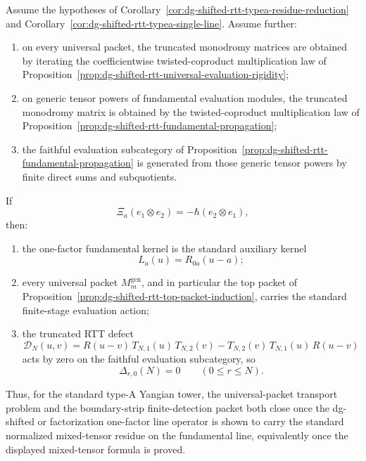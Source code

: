 \begin{corollary}
\label{cor:dg-shifted-rtt-typea-single-line-bootstrap}
Assume the hypotheses of
Corollary~\ref{cor:dg-shifted-rtt-typea-residue-reduction}
and
Corollary~\ref{cor:dg-shifted-rtt-typea-single-line}. Assume
further:
\begin{enumerate}[label=\textup{(\roman*)}]
\item on every universal packet, the truncated monodromy matrices are
 obtained by iterating the coefficientwise twisted-coproduct
 multiplication law of
 Proposition~\ref{prop:dg-shifted-rtt-universal-evaluation-rigidity};
\item on generic tensor powers of fundamental evaluation modules, the
 truncated monodromy matrix is obtained by the twisted-coproduct
 multiplication law of
 Proposition~\ref{prop:dg-shifted-rtt-fundamental-propagation};
\item the faithful evaluation subcategory of
 Proposition~\ref{prop:dg-shifted-rtt-fundamental-propagation} is
 generated from those generic tensor powers by finite direct sums and
 subquotients.
\end{enumerate}
If
\[
\Xi_a(e_1\otimes e_2)=-\hbar(e_2\otimes e_1),
\]
then:
\begin{enumerate}[label=\textup{(\alph*)}]
\item the one-factor fundamental kernel is the standard auxiliary
 kernel
 \[
 L_a(u)=R_{0a}(u-a);
 \]
\item every universal packet $M_m^{\mathrm{gen}}$, and in particular
 the top packet of
 Proposition~\ref{prop:dg-shifted-rtt-top-packet-induction}, carries
 the standard finite-stage evaluation action;
\item the truncated RTT defect
 \[
 \mathcal{D}_N(u,v)
 =
 R(u-v)\,T_{N,1}(u)\,T_{N,2}(v)
 -
 T_{N,2}(v)\,T_{N,1}(u)\,R(u-v)
 \]
 acts by zero on the faithful evaluation subcategory, so
 \[
 \Delta_{r,0}(N)=0
 \qquad (0\le r\le N).
 \]
\end{enumerate}
Thus, for the standard type-A Yangian tower, the universal-packet
transport problem and the boundary-strip finite-detection packet both
close once the dg-shifted or factorization one-factor line operator is
shown to carry the standard normalized mixed-tensor residue on the
fundamental line, equivalently once the displayed mixed-tensor formula
is proved.
\end{corollary}

